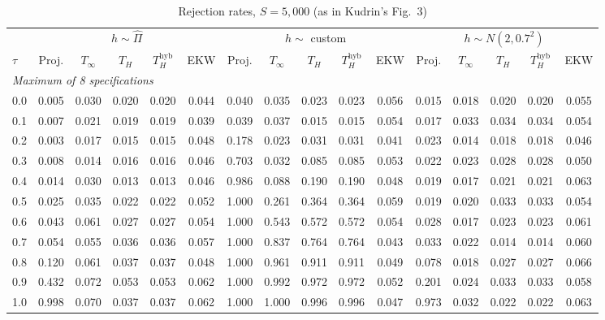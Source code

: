 \begin{table}[htbp]
\centering
\caption{Rejection rates, $S = 5{,}000$ (as in Kudrin's Fig.~3)}
\label{tab:kudrin_style_var_dial_plus_gammahat_S5000}
\footnotesize
\setlength{\tabcolsep}{4pt}
\begin{tabular}{lccccccccccccccc}
\toprule
 & \multicolumn{5}{c}{$h \sim \hat{\Pi}$} & \multicolumn{5}{c}{$h \sim$ custom} & \multicolumn{5}{c}{$h \sim N(2, 0.7^2)$} \\
\cmidrule(lr){2-6} \cmidrule(lr){7-11} \cmidrule(lr){12-16}
$\tau$ & Proj. & $T_\infty$ & $T_H$ & $T_H^{\mathrm{hyb}}$ & EKW & Proj. & $T_\infty$ & $T_H$ & $T_H^{\mathrm{hyb}}$ & EKW & Proj. & $T_\infty$ & $T_H$ & $T_H^{\mathrm{hyb}}$ & EKW \\
\midrule
\multicolumn{16}{l}{\textit{Maximum of 8 specifications}} \\
0.0 & 0.005 & 0.030 & 0.020 & 0.020 & 0.044 & 0.040 & 0.035 & 0.023 & 0.023 & 0.056 & 0.015 & 0.018 & 0.020 & 0.020 & 0.055 \\
0.1 & 0.007 & 0.021 & 0.019 & 0.019 & 0.039 & 0.039 & 0.037 & 0.015 & 0.015 & 0.054 & 0.017 & 0.033 & 0.034 & 0.034 & 0.054 \\
0.2 & 0.003 & 0.017 & 0.015 & 0.015 & 0.048 & 0.178 & 0.023 & 0.031 & 0.031 & 0.041 & 0.023 & 0.014 & 0.018 & 0.018 & 0.046 \\
0.3 & 0.008 & 0.014 & 0.016 & 0.016 & 0.046 & 0.703 & 0.032 & 0.085 & 0.085 & 0.053 & 0.022 & 0.023 & 0.028 & 0.028 & 0.050 \\
0.4 & 0.014 & 0.030 & 0.013 & 0.013 & 0.046 & 0.986 & 0.088 & 0.190 & 0.190 & 0.048 & 0.019 & 0.017 & 0.021 & 0.021 & 0.063 \\
0.5 & 0.025 & 0.035 & 0.022 & 0.022 & 0.052 & 1.000 & 0.261 & 0.364 & 0.364 & 0.059 & 0.019 & 0.020 & 0.033 & 0.033 & 0.054 \\
0.6 & 0.043 & 0.061 & 0.027 & 0.027 & 0.054 & 1.000 & 0.543 & 0.572 & 0.572 & 0.054 & 0.028 & 0.017 & 0.023 & 0.023 & 0.061 \\
0.7 & 0.054 & 0.055 & 0.036 & 0.036 & 0.057 & 1.000 & 0.837 & 0.764 & 0.764 & 0.043 & 0.033 & 0.022 & 0.014 & 0.014 & 0.060 \\
0.8 & 0.120 & 0.061 & 0.037 & 0.037 & 0.048 & 1.000 & 0.961 & 0.911 & 0.911 & 0.049 & 0.078 & 0.018 & 0.027 & 0.027 & 0.066 \\
0.9 & 0.432 & 0.072 & 0.053 & 0.053 & 0.062 & 1.000 & 0.992 & 0.972 & 0.972 & 0.052 & 0.201 & 0.024 & 0.033 & 0.033 & 0.058 \\
1.0 & 0.998 & 0.070 & 0.037 & 0.037 & 0.062 & 1.000 & 1.000 & 0.996 & 0.996 & 0.047 & 0.973 & 0.032 & 0.022 & 0.022 & 0.063 \\

\end{tabular}
\end{table}

